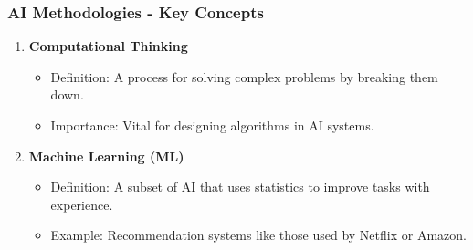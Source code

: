 \documentclass{beamer}
\begin{document}
\begin{frame}[fragile]
    \frametitle{AI Methodologies - Key Concepts}
    \begin{enumerate}
        \item \textbf{Computational Thinking} 
            \begin{itemize}
                \item Definition: A process for solving complex problems by breaking them down.
                \item Importance: Vital for designing algorithms in AI systems.
            \end{itemize}
        
        \item \textbf{Machine Learning (ML)} 
            \begin{itemize}
                \item Definition: A subset of AI that uses statistics to improve tasks with experience.
                \item Example: Recommendation systems like those used by Netflix or Amazon.
            \end{itemize}
    \end{enumerate}
\end{frame}
\end{document}
